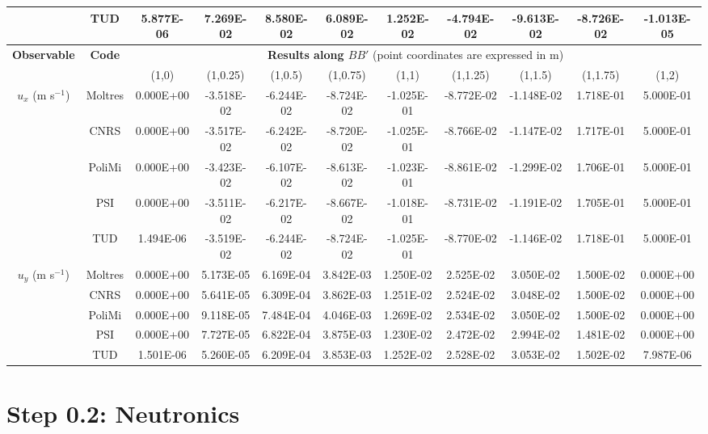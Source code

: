 \documentclass[letterpaper,11pt]{article}
\begin{document}
\begin{table}[htbp!]
\begin{tabular}{c c c c c c c c c c c}
        & TUD & 5.877E-06 & 7.269E-02 & 8.580E-02 & 6.089E-02 & 1.252E-02 & -4.794E-02 & -9.613E-02 & -8.726E-02 & -1.013E-05 \\
		\midrule
		\midrule
		\multirow{2}{*}{\textbf{Observable}} & \multirow{2}{*}{\textbf{Code}} & \multicolumn{9}{c}{\textbf{Results along $BB'$} (point coordinates are expressed in m)} \\
		& & {(1,0)} & {(1,0.25)} & {(1,0.5)} & {(1,0.75)} & {(1,1)} & {(1,1.25)} & {(1,1.5)} & {(1,1.75)} & {(1,2)} \\
		\midrule
		\multirow{5}{*}{$u_x$ (m s$^{-1}$)} & Moltres & 0.000E+00 & -3.518E-02 & -6.244E-02 & -8.724E-02 & -1.025E-01 & -8.772E-02 & -1.148E-02 & 1.718E-01 & 5.000E-01 \\
		& CNRS & 0.000E+00 & -3.517E-02 & -6.242E-02 & -8.720E-02 & -1.025E-01 & -8.766E-02 & -1.147E-02 & 1.717E-01 & 5.000E-01 \\
        & PoliMi & 0.000E+00 & -3.423E-02 & -6.107E-02 & -8.613E-02 & -1.023E-01 & -8.861E-02 & -1.299E-02 & 1.706E-01 & 5.000E-01 \\
        & PSI & 0.000E+00 & -3.511E-02 & -6.217E-02 & -8.667E-02 & -1.018E-01 & -8.731E-02 & -1.191E-02 & 1.705E-01 & 5.000E-01 \\
        & TUD & 1.494E-06 & -3.519E-02 & -6.244E-02 & -8.724E-02 & -1.025E-01 & -8.770E-02 & -1.146E-02 & 1.718E-01 & 5.000E-01 \\
        \midrule
		\multirow{5}{*}{$u_y$ (m s$^{-1}$)} & Moltres & 0.000E+00 & 5.173E-05 & 6.169E-04 & 3.842E-03 & 1.250E-02 & 2.525E-02 & 3.050E-02 & 1.500E-02 & 0.000E+00 \\
		& CNRS & 0.000E+00 & 5.641E-05 & 6.309E-04 & 3.862E-03 & 1.251E-02 & 2.524E-02 & 3.048E-02 & 1.500E-02 & 0.000E+00 \\
        & PoliMi & 0.000E+00 & 9.118E-05 & 7.484E-04 & 4.046E-03 & 1.269E-02 & 2.534E-02 & 3.050E-02 & 1.500E-02 & 0.000E+00 \\
        & PSI & 0.000E+00 & 7.727E-05 & 6.822E-04 & 3.875E-03 & 1.230E-02 & 2.472E-02 & 2.994E-02 & 1.481E-02 & 0.000E+00 \\
        & TUD & 1.501E-06 & 5.260E-05 & 6.209E-04 & 3.853E-03 & 1.252E-02 & 2.528E-02 & 3.053E-02 & 1.502E-02 & 7.987E-06 \\
		\bottomrule
	\end{tabular}
\end{table}

\pagebreak

\section*{Step 0.2: Neutronics}
\end{document}
